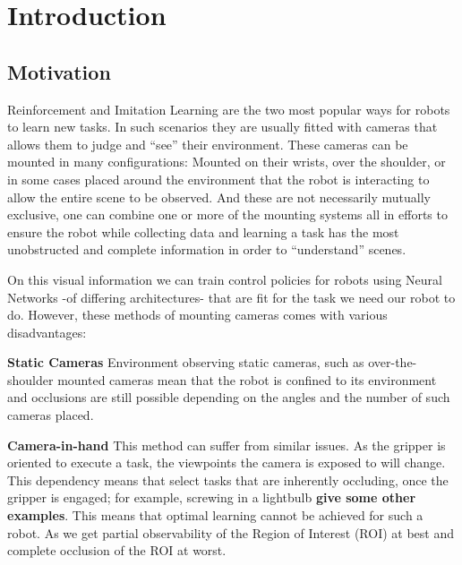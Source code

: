 \chapter{Introduction}
\section{Motivation}
    

  Reinforcement and Imitation Learning are the two most popular ways for robots to learn new tasks. In such scenarios they are usually fitted with cameras that allows them to judge and ``see'' their environment. These cameras can be mounted in many configurations: Mounted on their wrists\cite{chi2024UMIinthewild,openXEmbodimentRoboticLearning2024}, over the shoulder\cite{}, or in some cases placed around the environment\cite{} that the robot is interacting to allow the entire scene to be observed. And these are not necessarily mutually exclusive, one can combine one or more of the mounting systems\cite{exploringActiveVision2024chuang} all in efforts to ensure the robot while collecting data and learning a task has the most unobstructed and complete information in order to ``understand'' scenes.


  On this visual information we can train control policies for robots using Neural Networks\cite{spyros1995nnStateOfTheArt, Schmidhuber2015nn} -of differing architectures- that are fit for the task we need our robot to do. However, these methods of mounting cameras comes with various disadvantages:
  
  \textbf{Static Cameras} Environment observing static cameras, such as over-the-shoulder mounted cameras\cite{??} mean that the robot is confined to its environment and occlusions are still possible depending on the angles and the number of such cameras placed.
    
  \textbf{Camera-in-hand} This method can suffer from similar issues. As the gripper is oriented to execute a task, the viewpoints the camera is exposed to will change. This dependency means that select tasks that are inherently occluding, once the gripper is engaged; for example, screwing in a lightbulb \textbf{give some other examples}. This means that optimal learning cannot be achieved for such a robot. As we get partial observability of the Region of Interest (ROI) at best and complete occlusion of the ROI at worst.
    
